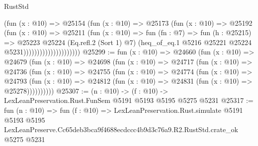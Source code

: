 \begin{lexlean}{RustStd}
\begin{coremodule}
                                  (fun (x : @10) =>
                                  @25154
                                    (fun (x : @10) =>
                                    @25173
                                      (fun (x : @10) =>
                                      @25192
                                        (fun (x : @10) =>
                                        @25211
                                          (fun (x : @10) =>
                                          fun (fn : @7) =>
                                          fun (h : @25215) =>
                                          @25223
                                            @25224
                                            (Eq.refl.{2} (Sort 1) @7)
                                            (heq_of_eq.{1}
                                              @5216
                                              @25221
                                              @25224
                                              @5231)))))))))))))))))))))
@25299 := fun (x : @10) =>
  @24660
    (fun (x : @10) =>
    @24679
      (fun (x : @10) =>
      @24698
        (fun (x : @10) =>
        @24717
          (fun (x : @10) =>
          @24736
            (fun (x : @10) =>
            @24755
              (fun (x : @10) =>
              @24774
                (fun (x : @10) =>
                @24793
                  (fun (x : @10) =>
                  @24812 (fun (x : @10) => @24831 (fun (x : @10) => @25278))))))))))
@25307 := (n : @10) -> (f : @10) -> LexLeanPreservation.Rust.FunSem @5191 @5193 @5195 @5275 @5231
@25317 := fun (n : @10) =>
  fun (f : @10) =>
  LexLeanPreservation.Rust.simulate
    @5191
    @5193
    @5195
    LexLeanPreserve.Cc65deb3bca9f4688ecdccc4b9d3c76a9.R2.RustStd.crate_ok
    @5275
    @5231
\end{coremodule}
\end{lexlean}
